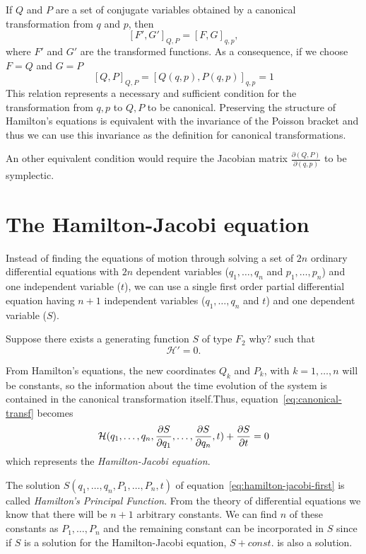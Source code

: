 \documentclass[../thesis.tex]{subfiles}
\theoremstyle{plain}
\begin{document}
If $Q$ and $P$ are a set of conjugate variables obtained by a canonical transformation
from $q$ and $p$, then
\[
  {\left[F', G'\right]}_{Q,P} = {\left[F, G\right]}_{q,p},
\]
where $F'$ and $G'$ are the transformed functions.
As a consequence, if we choose \(F=Q\) and \(G=P\)
\[
  {\left[Q, P\right]}_{Q,P} = {\left[Q(q,p), P(q,p)\right]}_{q,p} = 1
\]
This relation represents a necessary and sufficient condition for the transformation from
$q,p$ to $Q,P$ to be canonical.
Preserving the structure of Hamilton's equations is equivalent with the invariance of the
Poisson bracket and thus we can use this invariance as the definition for canonical
transformations.

An other equivalent condition would require the Jacobian matrix
\(\frac{\partial(Q,P)}{\partial(q,p)}\) to be {\color{red}symplectic}.

\section{The Hamilton-Jacobi equation}

Instead of finding the equations of motion through solving a set of \(2n\) ordinary differential
equations with \(2n\) dependent variables (\(q_1, \dotsc, q_n\) and \(p_1, \dotsc, p_n\))
and one independent variable (\(t\)), we can use a single first order partial differential equation
having \(n+1\) independent variables (\(q_1, \dotsc, q_n\) and \(t\)) and one
dependent variable (\(S\)).

Suppose there exists a generating function \(S\) of type \(F_2\) {\color{red}why?} such that
\[
  \mathcal{H'} = 0.
\]

From Hamilton's equations, the new coordinates \(Q_k\) and \(P_k\), with \(k=1,\dotsc,n\) will
be constants, so the information about the time evolution of the system is contained
in the canonical transformation itself.Thus, equation~\eqref{eq:canonical-transf} becomes
\begin{equation}
  \label{eq:hamilton-jacobi-first}
  \mathcal{H}(q_1,\dotsc,q_n,\pdv{S}{q_1},\dotsc,\pdv{S}{q_n},t) + \pdv{S}{t} = 0
\end{equation}
which represents the \emph{Hamilton-Jacobi equation}.

The solution \(S(q_1,\dotsc,q_n,P_1,\dotsc,P_n,t)\) of
equation~\eqref{eq:hamilton-jacobi-first} is called \emph{Hamilton's Principal Function}.
From the theory of differential equations we know that there will be \(n+1\) arbitrary constants.
We can find \(n\) of these constants as \(P_1,\dotsc,P_n\) and the remaining constant can be
incorporated in \(S\) since if \(S\) is a solution for the Hamilton-Jacobi equation,
\(S+const.\) is also a solution.
\end{document}
